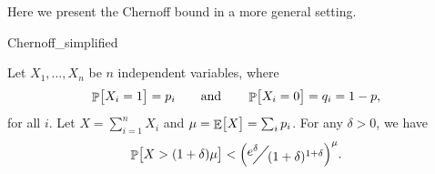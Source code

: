 Here we present the Chernoff bound in a more general setting.

\begin{fragment}{Chernoff_simplified}
    \begin{theorem}
        Let $X_1, \ldots, X_n$ be $n$ independent variables, where
        \begin{equation*}
            \Prob{ \bigl. X_i = 1 } =p_i
            \qquad\text{and}\qquad
            \Prob{ \bigl. X_i = 0 } =q_i = 1-p,
        \end{equation*}
        for all $i$.  Let $X = \sum_{i=1}^{n} X_i$ and
        $\mu = \mathop{\mathbb{E}}\!\left[ {\bigl. X} \right] = \sum_i p_i$.  For any $\delta > 0$, we have
        \begin{equation*}
            \Prob{ \bigl. X > (1+\delta)\mu } < \pth{
               \NiceFrac{e^\delta}{(1+\delta)^{1+\delta}}}^\mu.
        \end{equation*}


    \end{theorem}%

\end{fragment}

